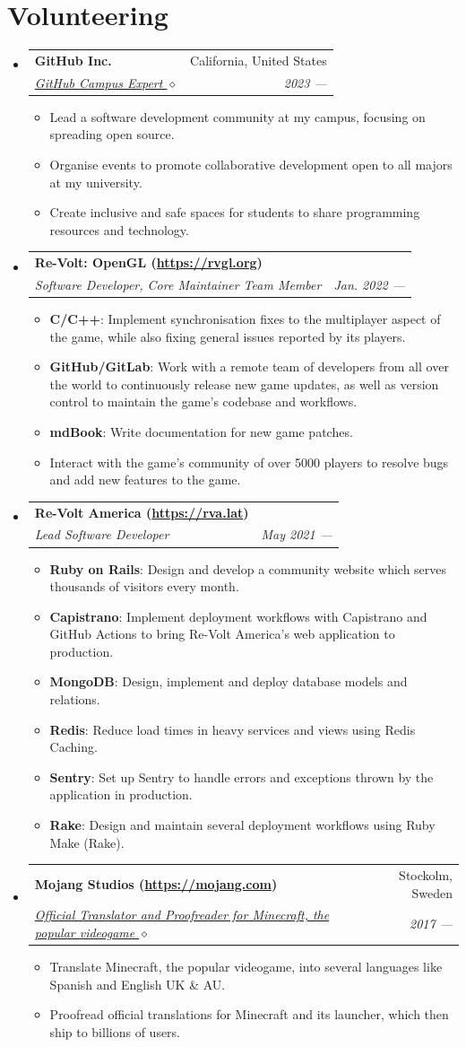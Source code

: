 \documentclass[letterpaper,11pt]{article}
\makeatletter
\newcommand{\resumeItem}[2]{
	\item\small{
		\textbf{#1}{: #2 \vspace{-2pt}}
	}
}
\newcommand{\resumeSubheading}[4]{
	\vspace{-1pt}\item
	\begin{tabular*}{0.97\textwidth}[t]{l@{\extracolsep{\fill}}r}
		\textbf{#1} & #2 \\
		\textit{\small#3} & \textit{\small #4} \\
	\end{tabular*}\vspace{-5pt}
}
\newcommand{\resumeSubHeadingListStart}{\begin{itemize}[leftmargin=*]}
\newcommand{\resumeSubHeadingListEnd}{\end{itemize}}
\newcommand{\resumeItemListStart}{\begin{itemize}}
\newcommand{\resumeItemListEnd}{\end{itemize}\vspace{-5pt}}
\makeatother
\begin{document}
	\section{Volunteering}
	\resumeSubHeadingListStart
	\resumeSubheading
	{GitHub Inc.}{California, United States}
	{\href{https://githubcampus.expert/BGMP}{GitHub Campus Expert $\diamond$}}{2023 ---}
	\resumeItemListStart
	\item{Lead a software development community at my campus, focusing on spreading open source.}
	\item{Organise events to promote collaborative development open to all majors at my university.}
	\item{Create inclusive and safe spaces for students to share programming resources and technology.}
	\resumeItemListEnd
	\resumeSubheading
	{Re-Volt: OpenGL (\textnormal{\url{https://rvgl.org}})}{}
	{Software Developer, Core Maintainer Team Member}{Jan. 2022 ---}
	\resumeItemListStart
	\resumeItem{C/C++}{Implement synchronisation fixes to the multiplayer aspect of the game, while also fixing general issues reported by its players.}
	\resumeItem{GitHub/GitLab}{Work with a remote team of developers from all over the world to continuously release new game updates, as well as version control to maintain the game's codebase and workflows.}
	\resumeItem{mdBook}{Write documentation for new game patches.}
	\item{Interact with the game's community of over 5000 players to resolve bugs and add new features to the game.}
	\resumeItemListEnd
	\resumeSubheading
	{Re-Volt America (\textnormal{\url{https://rva.lat}})}{}
	{Lead Software Developer}{May 2021 ---}
	\resumeItemListStart
	\resumeItem{Ruby on Rails}{Design and develop a community website which serves thousands of visitors every month.}
	\resumeItem{Capistrano}{Implement deployment workflows with Capistrano and GitHub Actions to bring Re-Volt America's web application to production.}
	\resumeItem{MongoDB}{Design, implement and deploy database models and relations.}
	\resumeItem{Redis}{Reduce load times in heavy services and views using Redis Caching.}
	\resumeItem{Sentry}{Set up Sentry to handle errors and exceptions thrown by the application in production.}
	\resumeItem{Rake}{Design and maintain several deployment workflows using Ruby Make (Rake).}
	\resumeItemListEnd
	\resumeSubheading
	{Mojang Studios (\textnormal{\url{https://mojang.com}})}{Stockolm, Sweden}
	{\href{https://crowdin.com/profile/bgm}{Official Translator and Proofreader for Minecraft, the popular videogame $\diamond$}}{2017 ---}
	\resumeItemListStart
	\item{Translate Minecraft, the popular videogame, into several languages like Spanish and English UK \& AU.}
	\item{Proofread official translations for Minecraft and its launcher, which then ship to billions of users.}
	\resumeItemListEnd
	\resumeSubHeadingListEnd
	
\end{document}
